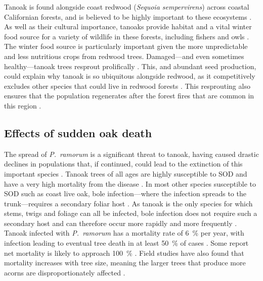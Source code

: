 Tanoak is found alongside coast redwood (\textit{Sequoia sempervirens}) across coastal Californian forests, and is believed to be highly important to these ecosystems \citep{noss_redwood_2000}. As well as their cultural importance, tanoaks provide habitat and a vital winter food source for a variety of wildlife in these forests, including fishers and owls \citep{long_recent_2018}. The winter food source is particularly important given the more unpredictable and less nutritious crops from redwood trees. Damaged---and even sometimes healthy---tanoak trees resprout prolifically \citep{tappeiner_lithocarpus_1990}. This, and abundant seed production, could explain why tanoak is so ubiquitous alongside redwood, as it competitively excludes other species that could live in redwood forests \citep{ramage_forest_2011}. This resprouting also ensures that the population regenerates after the forest fires that are common in this region \citep{mcdonald_california_2002, ramage_role_2010}.

\subsection{Effects of sudden oak death}

The spread of \textit{P.~ramorum} is a significant threat to tanoak, having caused drastic declines in populations that, if continued, could lead to the extinction of this important species \citep{mcpherson_responses_2010}. Tanoak trees of all ages are highly susceptible to SOD and have a very high mortality from the disease \citep{davis_preimpact_2010}. In most other species susceptible to SOD such as coast live oak, bole infection---where the infection spreads to the trunk---requires a secondary foliar host \citep{rizzo_phytophthora_2005}. As tanoak is the only species for which stems, twigs and foliage can all be infected, bole infection does not require such a secondary host and can therefore occur more rapidly and more frequently \citep{rizzo_sudden_2003}. Tanoak infected with \textit{P.~ramorum} has a mortality rate of \SI{6}{\percent} per year, with infection leading to eventual tree death in at least \SI{50}{\percent} of cases \citep{mcpherson_responses_2010}. Some report net mortality is likely to approach \SI{100}{\percent} \citep{ramage_sudden_2010}. Field studies have also found that mortality increases with tree size, meaning the larger trees that produce more acorns are disproportionately affected \citep{cobb_ecosystem_2012}.

